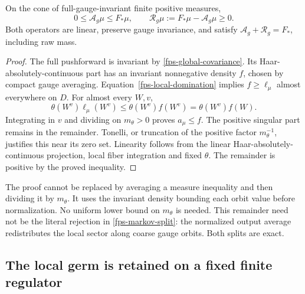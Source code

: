 \begin{theorem}
\label{fps-positive-split}
On the cone of full-gauge-invariant finite positive measures,
\begin{equation}
 0\le\mathcal A_g\mu\le F_*\mu,\qquad
 \mathcal R_g\mu:=F_*\mu-\mathcal A_g\mu\ge0.
 \label{fps-positive-operators}
\end{equation}
Both operators are linear, preserve gauge invariance, and satisfy
\(\mathcal A_g+\mathcal R_g=F_*\), including raw mass.
\end{theorem}
\begin{proof}
The full pushforward is invariant by
\eqref{fps-global-covariance}. Its Haar-absolutely-continuous part has
an invariant nonnegative density \(f\), chosen by compact gauge
averaging. Equation~\eqref{fps-local-domination} implies
\(f\ge\ell_\mu\) almost everywhere on \(D\). For almost every \(W,v\),
\[
 \theta(W^v)\ell_\mu(W^v)\le\theta(W^v)f(W^v)
                              =\theta(W^v)f(W).
\]
Integrating in \(v\) and dividing on \(m_\theta>0\) proves
\(a_\mu\le f\). The positive singular part remains in the remainder.
Tonelli, or truncation of the positive factor \(m_\theta^{-1}\),
justifies this near its zero set. Linearity follows from the linear
Haar-absolutely-continuous projection, local fiber integration and
fixed \(\theta\). The remainder is positive by the proved inequality.
\end{proof}

The proof cannot be replaced by averaging a measure inequality and
then dividing it by \(m_\theta\). It uses the invariant density bounding
each orbit value before normalization. No uniform lower bound on
\(m_\theta\) is needed. This remainder need not be the literal rejection
in \eqref{fps-markov-split}: the normalized output average redistributes
the local sector along coarse gauge orbits. Both splits are exact.

\subsection{The local germ is retained on a fixed finite regulator}
\label{fps-germ-section}

